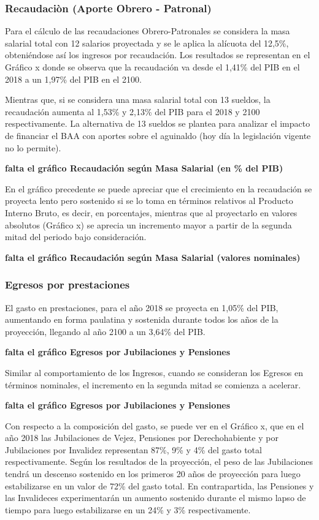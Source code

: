 \documentclass[a4paper,11pt]{article}
\begin{document}
\subsubsection{Recaudaciòn (Aporte Obrero - Patronal)}

Para el cálculo de las recaudaciones Obrero-Patronales se considera la masa salarial total con 12 salarios proyectada y se le aplica la alícuota del 12,5\%, obteniéndose así los ingresos por recaudación. Los resultados se representan en el Gráfico x donde se observa que la recaudación va desde el 1,41\% del PIB en el 2018 a un 1,97\% del PIB en el 2100.

Mientras que, si se considera una masa salarial total con 13 sueldos, la recaudación aumenta al 1,53\% y 2,13\% del PIB para el 2018 y 2100 respectivamente.  La alternativa de 13 sueldos se plantea para analizar el impacto de financiar el BAA con aportes sobre el aguinaldo (hoy día la legislación vigente no lo permite).

\textbf{falta el gráfico Recaudación según Masa Salarial (en \% del PIB)}

En el gráfico precedente se puede apreciar que el crecimiento en la recaudación se proyecta lento pero sostenido si se lo toma en términos relativos al Producto Interno Bruto, es decir, en porcentajes, mientras que al proyectarlo en valores absolutos (Gráfico x) se aprecia un incremento mayor a partir de la segunda mitad del periodo bajo consideración.

\textbf{falta el gráfico Recaudación según Masa Salarial (valores nominales)}

\subsubsection{Egresos por prestaciones}

El gasto en prestaciones, para el año 2018 se proyecta en 1,05\% del PIB, aumentando en forma paulatina y sostenida durante todos los años de la proyección, llegando al año 2100 a un 3,64\% del PIB.

\textbf{falta el gráfico Egresos por Jubilaciones y Pensiones}

Similar al comportamiento de los Ingresos, cuando se consideran los Egresos en términos nominales, el incremento en la segunda mitad se comienza a acelerar.

\textbf{falta el gráfico Egresos por Jubilaciones y Pensiones}

Con respecto a la composición del gasto, se puede ver en el Gráfico x, que en el año 2018 las Jubilaciones de Vejez, Pensiones por Derechohabiente y por Jubilaciones por Invalidez representan 87\%, 9\% y 4\% del gasto total respectivamente. Según los resultados de la proyección, el peso de las Jubilaciones tendrá un descenso sostenido en los primeros 20 años de proyección para luego estabilizarse en un valor de 72\% del gasto total. En contrapartida, las Pensiones y las Invalideces experimentarán un aumento sostenido durante el mismo lapso de tiempo para luego estabilizarse en un 24\% y 3\% respectivamente.
\end{document}
